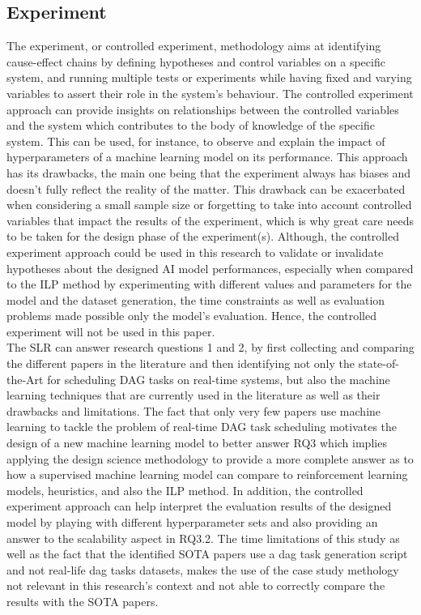 \subsection{Experiment}
 
 
The experiment, or controlled experiment, methodology aims at identifying cause-effect 
chains by defining hypotheses and control variables on a specific system,
and running multiple tests or experiments while having fixed and varying variables to assert 
their role in the system's behaviour\cite{basili2007controlledExperiment}.
The controlled experiment approach 
can provide insights on relationships between the controlled variables and the system
which contributes to the body of knowledge of the specific system.
This can be used, for instance, to observe and explain the impact of hyperparameters of a machine learning
model on its performance.
This approach has its drawbacks, the main one being 
that the experiment always has biases and doesn't fully reflect the reality
of the matter. This drawback can be exacerbated when considering 
a small sample size or forgetting
to take into account controlled variables that impact the results
of the experiment, which is why great care needs to be taken 
for the design phase of the experiment(s).
Although, the controlled experiment approach could be used in this research to validate or invalidate hypotheses
about the designed AI model performances, especially when compared to the ILP method by
experimenting with different values and parameters for the model and the dataset generation,
the time constraints as well as evaluation problems made possible only the model's evaluation.
Hence, the controlled experiment will not be used in this paper.
\\

The SLR can answer research questions 1 and 2,
by first collecting and comparing the different papers in the literature
and then identifying not only the state-of-the-Art for scheduling DAG tasks on real-time systems,
but also the machine learning techniques that are currently used in the literature as well as their drawbacks and limitations.
The fact that only very few papers use machine learning to tackle the problem of real-time DAG task scheduling
motivates the design of a new machine learning model to better answer RQ3 which implies 
applying the design science methodology to provide a more complete answer as to how a supervised machine learning model 
can compare to reinforcement learning models, heuristics, and also the ILP method.
In addition, the controlled experiment approach can help interpret the evaluation results of the designed model by 
playing with different hyperparameter sets and also  
 providing an answer to the scalability aspect in RQ3.2.
The time limitations of this study as well as the fact that the identified SOTA papers
use a dag task generation script and not real-life dag tasks datasets, makes
the use of the case study methology not relevant in this research's context and not able to correctly compare the results with 
the SOTA papers. 


